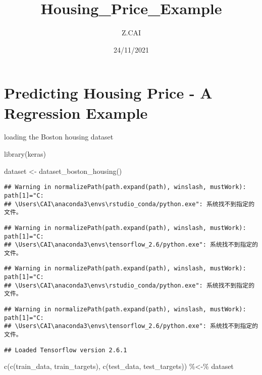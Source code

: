 \documentclass[
]{article}
\title{Housing\_Price\_Example}
\author{Z.CAI}
\date{24/11/2021}
\newenvironment{Shaded}{\begin{snugshade}}{\end{snugshade}}
\newcommand{\FunctionTok}[1]{\textcolor[rgb]{0.00,0.00,0.00}{#1}}
\newcommand{\NormalTok}[1]{#1}
\newcommand{\OtherTok}[1]{\textcolor[rgb]{0.56,0.35,0.01}{#1}}
\newcommand{\SpecialCharTok}[1]{\textcolor[rgb]{0.00,0.00,0.00}{#1}}
\begin{document}
\maketitle

\hypertarget{predicting-housing-price---a-regression-example}{%
\section{Predicting Housing Price - A Regression
Example}\label{predicting-housing-price---a-regression-example}}

loading the Boston housing dataset

\begin{Shaded}
\begin{Highlighting}[]
\FunctionTok{library}\NormalTok{(keras)}

\NormalTok{dataset }\OtherTok{\textless{}{-}} \FunctionTok{dataset\_boston\_housing}\NormalTok{()}
\end{Highlighting}
\end{Shaded}

\begin{verbatim}
## Warning in normalizePath(path.expand(path), winslash, mustWork): path[1]="C:
## \Users\CAI\anaconda3\envs\rstudio_conda/python.exe": 系统找不到指定的文件。
\end{verbatim}

\begin{verbatim}
## Warning in normalizePath(path.expand(path), winslash, mustWork): path[1]="C:
## \Users\CAI\anaconda3\envs\tensorflow_2.6/python.exe": 系统找不到指定的文件。
\end{verbatim}

\begin{verbatim}
## Warning in normalizePath(path.expand(path), winslash, mustWork): path[1]="C:
## \Users\CAI\anaconda3\envs\rstudio_conda/python.exe": 系统找不到指定的文件。
\end{verbatim}

\begin{verbatim}
## Warning in normalizePath(path.expand(path), winslash, mustWork): path[1]="C:
## \Users\CAI\anaconda3\envs\tensorflow_2.6/python.exe": 系统找不到指定的文件。
\end{verbatim}

\begin{verbatim}
## Loaded Tensorflow version 2.6.1
\end{verbatim}

\begin{Shaded}
\begin{Highlighting}[]
\FunctionTok{c}\NormalTok{(}\FunctionTok{c}\NormalTok{(train\_data, train\_targets), }\FunctionTok{c}\NormalTok{(test\_data, test\_targets)) }\SpecialCharTok{\%\textless{}{-}\%}\NormalTok{ dataset}
\end{Highlighting}
\end{Shaded}
\end{document}
